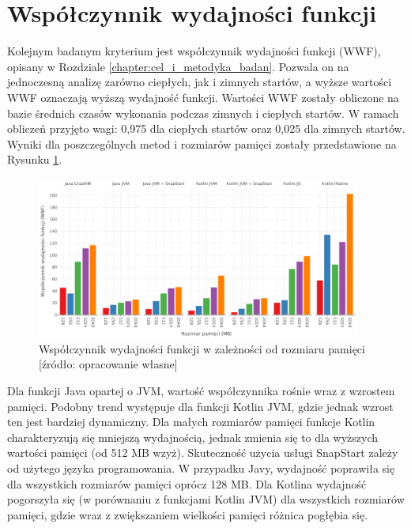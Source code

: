 \newpage
\section{Współczynnik wydajności funkcji}\label{chapter:results_wwf}

Kolejnym badanym kryterium jest współczynnik wydajności funkcji (WWF), opisany w Rozdziale \ref{chapter:cel_i_metodyka_badan}.
Pozwala on na jednoczesną analizę zarówno ciepłych, jak i zimnych startów, a wyższe wartości WWF oznaczają wyższą wydajność funkcji.
Wartości WWF zostały obliczone na bazie średnich czasów wykonania podczas zimnych i ciepłych startów.
W ramach obliczeń przyjęto wagi: 0,975 dla ciepłych startów oraz 0,025 dla zimnych startów.
Wyniki dla poszczególnych metod i rozmiarów pamięci zostały przedstawione na Rysunku \ref{fig:avg_wwf}.

\begin{figure}[h]
    \centering
    \includegraphics[width=0.95\textwidth]{charts/results/wwf.png}
    \caption{Współczynnik wydajności funkcji w zależności od rozmiaru pamięci [źródło: opracowanie własne]}
    \label{fig:avg_wwf}
\end{figure}

Dla funkcji Java opartej o JVM, wartość współczynnika rośnie wraz z wzrostem pamięci.
Podobny trend występuje dla funkcji Kotlin JVM, gdzie jednak wzrost ten jest bardziej dynamiczny.
Dla małych rozmiarów pamięci funkcje Kotlin charakteryzują się mniejszą wydajnością, jednak zmienia się to dla wyższych wartości pamięci (od 512 MB wzyż).
Skuteczność użycia usługi SnapStart zależy od użytego języka programowania.
W przypadku Javy, wydajność poprawiła się dla wszystkich rozmiarów pamięci oprócz 128 MB. 
Dla Kotlina wydajność pogorszyła się (w porównaniu z funkcjami Kotlin JVM) dla wszystkich rozmiarów pamięci, gdzie wraz z zwiększaniem wielkości pamięci różnica pogłębia się.

